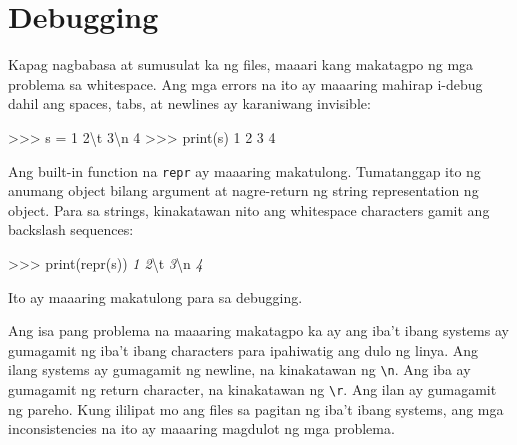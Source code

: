 \documentclass[10pt,]{book}
\newenvironment{Shaded}{}{}
\newcommand{\BuiltInTok}[1]{\textcolor[rgb]{0.00,0.50,0.00}{#1}}
\newcommand{\CharTok}[1]{\textcolor[rgb]{0.25,0.44,0.63}{#1}}
\newcommand{\CommentTok}[1]{\textcolor[rgb]{0.38,0.63,0.69}{\textit{#1}}}
\newcommand{\DecValTok}[1]{\textcolor[rgb]{0.25,0.63,0.44}{#1}}
\newcommand{\NormalTok}[1]{#1}
\newcommand{\OperatorTok}[1]{\textcolor[rgb]{0.40,0.40,0.40}{#1}}
\newcommand{\StringTok}[1]{\textcolor[rgb]{0.25,0.44,0.63}{#1}}
\begin{document}
 

\section{Debugging}\label{debugging-6}

 

Kapag nagbabasa at sumusulat ka ng files, maaari kang makatagpo ng mga
problema sa whitespace. Ang mga errors na ito ay maaaring mahirap
i-debug dahil ang spaces, tabs, at newlines ay karaniwang invisible:

\begin{Shaded}
\begin{Highlighting}[]
\OperatorTok{\textgreater{}\textgreater{}\textgreater{}}\NormalTok{ s }\OperatorTok{=} \StringTok{\textquotesingle{}1 2}\CharTok{\textbackslash{}t}\StringTok{ 3}\CharTok{\textbackslash{}n}\StringTok{ 4\textquotesingle{}}
\OperatorTok{\textgreater{}\textgreater{}\textgreater{}} \BuiltInTok{print}\NormalTok{(s)}
\DecValTok{1} \DecValTok{2}  \DecValTok{3}
 \DecValTok{4}
\end{Highlighting}
\end{Shaded}

 

Ang built-in function na \texttt{repr} ay maaaring makatulong.
Tumatanggap ito ng anumang object bilang argument at nagre-return ng
string representation ng object. Para sa strings, kinakatawan nito ang
whitespace characters gamit ang backslash sequences:

\begin{Shaded}
\begin{Highlighting}[]
\OperatorTok{\textgreater{}\textgreater{}\textgreater{}} \BuiltInTok{print}\NormalTok{(}\BuiltInTok{repr}\NormalTok{(s))}
\CommentTok{\textquotesingle{}1 2}\CharTok{\textbackslash{}t}\CommentTok{ 3}\CharTok{\textbackslash{}n}\CommentTok{ 4\textquotesingle{}}
\end{Highlighting}
\end{Shaded}

Ito ay maaaring makatulong para sa debugging.

Ang isa pang problema na maaaring makatagpo ka ay ang iba't ibang
systems ay gumagamit ng iba't ibang characters para ipahiwatig ang dulo
ng linya. Ang ilang systems ay gumagamit ng newline, na kinakatawan ng
\texttt{\textbackslash{}n}. Ang iba ay gumagamit ng return character, na
kinakatawan ng \texttt{\textbackslash{}r}. Ang ilan ay gumagamit ng
pareho. Kung ililipat mo ang files sa pagitan ng iba't ibang systems,
ang mga inconsistencies na ito ay maaaring magdulot ng mga problema.
\end{document}
